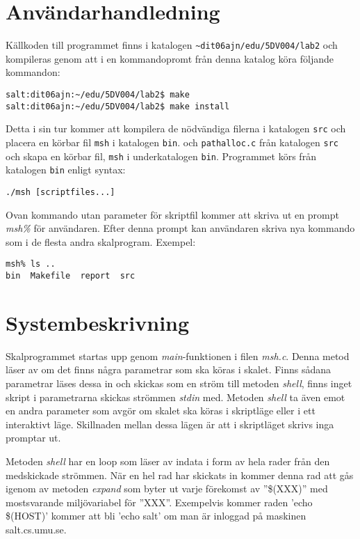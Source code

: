 \documentclass[a4paper, 12pt]{article}
\begin{document}
\section{Användarhandledning}\label{sec:anvandarhandledning}
Källkoden till programmet finns i katalogen
\verb!~dit06ajn/edu/5DV004/lab2! och kompileras genom att i en
kommandopromt från denna katalog köra följande kommandon:

\begin{verbatim}
salt:dit06ajn:~/edu/5DV004/lab2$ make
salt:dit06ajn:~/edu/5DV004/lab2$ make install
\end{verbatim}

Detta i sin tur kommer att kompilera de nödvändiga filerna i katalogen
\verb!src! och placera en körbar fil \verb!msh! i katalogen \verb!bin!. och
\verb!pathalloc.c! från katalogen \verb!src! och skapa en körbar fil,
\verb!msh! i underkatalogen \verb!bin!. Programmet körs från katalogen
\verb!bin! enligt syntax:

\verb!./msh [scriptfiles...]!

Ovan kommando utan parameter för skriptfil kommer att skriva ut en
prompt \textit{msh\%} för användaren. Efter denna prompt kan
användaren skriva nya kommando som i de flesta andra skalprogram.
Exempel:
\begin{verbatim}
msh% ls ..
bin  Makefile  report  src
\end{verbatim}

% 
% 

\section{Systembeskrivning}\label{sec:systembeskrivning}
Skalprogrammet startas upp genom \textit{main}-funktionen i filen
\textit{msh.c}. Denna metod läser av om det finns några parametrar som
ska köras i skalet. Finns sådana parametrar läses dessa in och skickas
som en ström till metoden \textit{shell}, finns inget skript i
parametrarna skickas strömmen \textit{stdin} med. Metoden
\textit{shell} ta även emot en andra parameter som avgör om skalet ska
köras i skriptläge eller i ett interaktivt läge. Skillnaden
mellan dessa lägen är att i skriptläget skrivs inga promptar ut.

Metoden \textit{shell} har en loop som läser av indata i form av hela
rader från den medskickade strömmen. När en hel rad har skickats in
kommer denna rad att gås igenom av metoden \textit{expand} som byter
ut varje förekomst av ''\$(XXX)'' med mostsvarande miljövariabel för
''XXX''. Exempelvis kommer raden 'echo \$(HOST)' kommer att bli 'echo
salt' om man är inloggad på maskinen salt.cs.umu.se.
\end{document}
